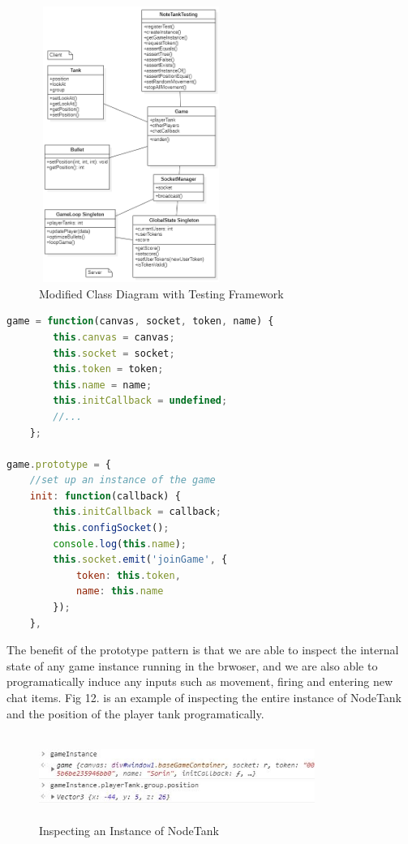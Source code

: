 \documentclass[conference]{IEEEtran}
\begin{document}
\begin{figure}[htbp]
\centerline{\includegraphics [width = 6cm, height = 9cm] {classv2.PNG}}
\caption{Modified Class Diagram with Testing Framework}
\end{figure}

\begin{lstlisting}[language=JavaScript,caption={Snippet of the Game Class}]
    game = function(canvas, socket, token, name) {
		this.canvas = canvas;
		this.socket = socket;
		this.token = token;
		this.name = name;
		this.initCallback = undefined;
		//...
	};

game.prototype = {
    //set up an instance of the game
    init: function(callback) {
        this.initCallback = callback;
        this.configSocket();
        console.log(this.name);
        this.socket.emit('joinGame', {
            token: this.token,
            name: this.name
        });
    },
\end{lstlisting}


The benefit of the prototype pattern is that we are able to inspect the internal state of any game instance running in the brwoser, and we are also able to programatically induce 
any inputs such as movement, firing and entering new chat items. Fig 12. is an example of inspecting the entire instance of NodeTank and the position of the player tank programatically.

\begin{figure}[htbp]
\centerline{\includegraphics [width = 9cm, height = 2.8cm] {GameInspection.jpg}}
\caption{Inspecting an Instance of NodeTank}
\end{figure}
\end{document}
